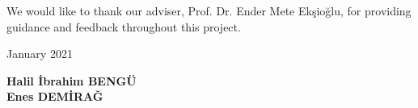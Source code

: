 \setcounter{page}{5}

We would like to thank our adviser, Prof. Dr. Ender Mete Ekşioğlu, for providing guidance and feedback throughout this project.
\newline

January 2021 \newline
\begin{flushright}
\textbf{Halil İbrahim BENGÜ} \\
\textbf{Enes DEMİRAĞ}
\end{flushright}